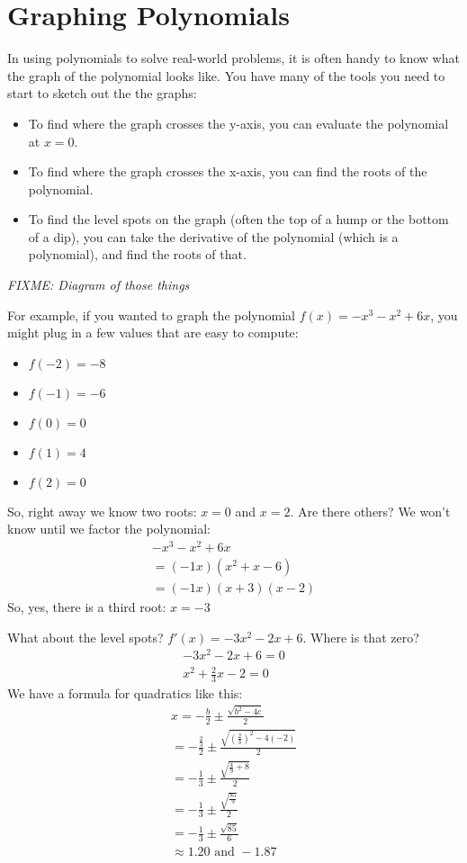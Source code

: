 \chapter{Graphing Polynomials}

In using polynomials to solve real-world problems, it is often handy
to know what the graph of the polynomial looks like. You have many of
the tools you need to start to sketch out the the graphs:
\begin{itemize}
\item To find where the graph crosses the y-axis, you can evaluate the polynomial at $x = 0$.
\item To find where the graph crosses the x-axis, you can find the roots of the polynomial.
\item To find the level spots on the graph (often the top of a hump or the bottom of a dip), you can take the derivative of the polynomial (which is a polynomial), and find the roots of that.
\end{itemize}

\textit{FIXME: Diagram of those things}

For example, if you wanted to graph the polynomial $f(x) = -x^3 -x^2 +
6x$, you might plug in a few values that are easy to compute:
\begin{itemize}
\item $f(-2) = -8$
\item $f(-1) = -6$
\item $f(0) = 0$
\item $f(1) = 4$
\item $f(2) = 0$ 
\end{itemize}

So, right away we know two roots: $x = 0$ and $x = 2$. Are there
others? We won't know until we factor the polynomial:
\begin{multline*}
  -x^3 -x^2 + 6x \\
  = (-1x)(x^2 + x - 6) \\
  = (-1x)(x + 3)(x - 2)
\end{multline*}
So, yes, there is a third root: $x = -3$

What about the level spots? $f'(x) = -3x^2 - 2x + 6$. Where is that zero?
\begin{multline*}
  -3x^2 -2x + 6 = 0 \\
  x^2 + \frac{2}{3}x - 2 = 0
\end{multline*}
We have a formula for quadratics like this:
\begin{multline*}
  x = -\frac{b}{2} \pm \frac{\sqrt{b^2 - 4c}}{2} \\
  = -\frac{\frac{2}{3}}{2} \pm \frac{\sqrt{\left(\frac{2}{3}\right)^2 - 4(-2)}}{2} \\
  = -\frac{1}{3} \pm \frac{\sqrt{\frac{4}{9} + 8}}{2} \\
  = -\frac{1}{3} \pm \frac{\sqrt{\frac{85}{9}}}{2} \\
  = -\frac{1}{3} \pm \frac{\sqrt{85}}{6} \\
  \approx 1.20 \text{ and } -1.87 
\end{multline*}

